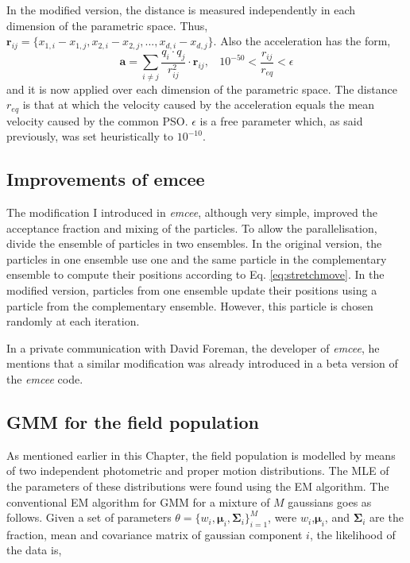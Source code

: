 In the modified version, the distance is measured independently in each dimension of the parametric space. Thus, $\mathbf{r}_{ij}= \{x_{1,i} -x_{1,j},x_{2,i} -x_{2,j},...,x_{d,i} -x_{d,j}\}$. Also the acceleration has the form,
\begin{equation}
\label{eq:PSOacc}
\mathbf{a}=\sum_{i\neq j} \frac{q_i \cdot q_j }{r_{ij}^2} \cdot \mathbf{r}_{ij}, \ \ \ \  10^{-50} < \frac{r_{ij}}{r_{eq}} < \epsilon
\end{equation}
and it is now applied over each dimension of the parametric space. The distance $r_{eq}$ is that at which the velocity caused by the acceleration equals the mean velocity caused by the common PSO. $\epsilon$ is a free parameter which, as said previously, was set heuristically to $10^{-10}$.

\subsection{Improvements of emcee}
The modification I introduced in \emph{emcee}, although very simple, improved the acceptance fraction and mixing of the particles.
To allow the parallelisation, \citet{Foreman2013} divide the ensemble of particles in two ensembles. In the original version, the particles in one ensemble use one and the same particle in the complementary ensemble to compute their positions according to Eq. \ref{eq:stretchmove}. In the modified version, particles from one ensemble update their positions using a particle from the complementary ensemble. However, this particle is chosen randomly at each iteration. 

In a private communication with David Foreman, the developer of \emph{emcee}, he mentions that a similar modification was already introduced in a beta version of the \emph{emcee} code.

\subsection{GMM for the field population}
As mentioned earlier in this Chapter, the field population is modelled by means of two independent photometric and proper motion distributions. The MLE of the parameters of these distributions were found using the EM algorithm.  The conventional EM algorithm for GMM \citep{Dempster1977} for a mixture of $M$ gaussians goes as follows. Given a set of parameters $\theta=\{w_i,\boldsymbol{\mu}_i,\boldsymbol{\Sigma}_i\}_{i=1}^M$, were $w_i$,$\boldsymbol{\mu}_i$, and $\boldsymbol{\Sigma}_i$ are the fraction, mean and covariance matrix of gaussian component $i$, the likelihood of the data is,

